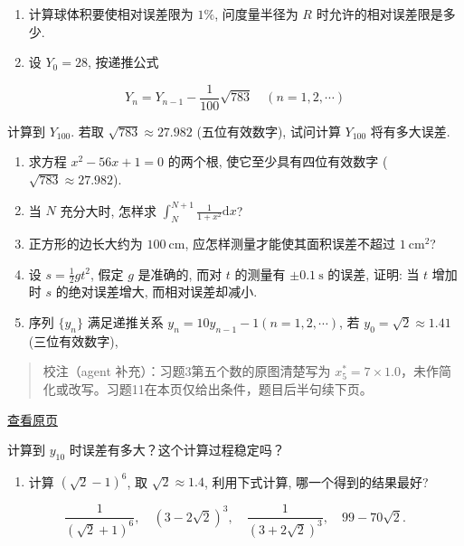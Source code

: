 \documentclass[
  10pt,
  fontset=fandol]{ctexart}
\providecommand{\tightlist}{%
  \setlength{\itemsep}{0pt}\setlength{\parskip}{0pt}}
\begin{document}
\begin{enumerate}
\def\labelenumi{\arabic{enumi}.}
\setcounter{enumi}{4}
\item
  计算球体积要使相对误差限为 \(1\%\), 问度量半径为 \(R\) 时允许的相对误差限是多少.
\item
  设 \(Y_0=28\), 按递推公式
\end{enumerate}

\[
Y_n = Y_{n-1} - \frac{1}{100} \sqrt{783} \quad (n=1,2,\cdots)
\]

计算到 \(Y_{100}\). 若取 \(\sqrt{783} \approx 27.982\) (五位有效数字), 试问计算 \(Y_{100}\) 将有多大误差.

\begin{enumerate}
\def\labelenumi{\arabic{enumi}.}
\setcounter{enumi}{6}
\item
  求方程 \(x^2-56x+1=0\) 的两个根, 使它至少具有四位有效数字 (\(\sqrt{783} \approx 27.982\)).
\item
  当 \(N\) 充分大时, 怎样求 \(\int_N^{N+1} \frac{1}{1+x^2} \mathrm{d}x\)?
\item
  正方形的边长大约为 \(100 \mathrm{~cm}\), 应怎样测量才能使其面积误差不超过 \(1 \mathrm{~cm}^2\)?
\item
  设 \(s=\frac{1}{2} g t^2\), 假定 \(g\) 是准确的, 而对 \(t\) 的测量有 \(\pm 0.1 \mathrm{~s}\) 的误差, 证明: 当 \(t\) 增加时 \(s\) 的绝对误差增大, 而相对误差却减小.
\item
  序列 \(\{y_n\}\) 满足递推关系 \(y_n=10y_{n-1}-1 (n=1,2,\cdots)\), 若 \(y_0=\sqrt{2} \approx 1.41\) (三位有效数字),
\end{enumerate}

\begin{quote}
校注（agent 补充）：习题3第五个数的原图清楚写为 \(x_5^*=7\times1.0\)，未作简化或改写。习题11在本页仅给出条件，题目后半句续下页。
\end{quote}

\href{../../source-images/pdf-026.jpeg}{查看原页}

计算到 \(y_{10}\) 时误差有多大？这个计算过程稳定吗？

\begin{enumerate}
\def\labelenumi{\arabic{enumi}.}
\setcounter{enumi}{11}
\tightlist
\item
  计算 \((\sqrt{2}-1)^6\), 取 \(\sqrt{2} \approx 1.4\), 利用下式计算, 哪一个得到的结果最好?
\end{enumerate}

\[
\frac{1}{(\sqrt{2}+1)^6}, \quad (3-2\sqrt{2})^3, \quad \frac{1}{(3+2\sqrt{2})^3}, \quad 99-70\sqrt{2}.
\]
\end{document}
